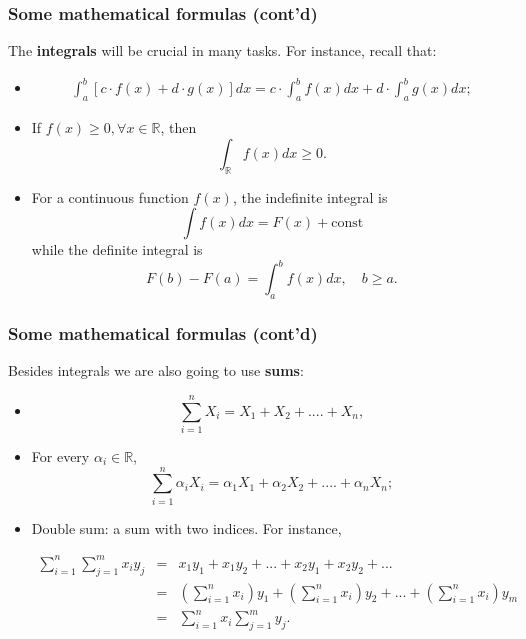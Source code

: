 \documentclass[notes=show,handout]{beamer}
\newcommand{\bea}{\begin{eqnarray}}
\newcommand{\eea}{\end{eqnarray}}
\newcommand{\nn}{\nonumber}
\begin{document}
\begin{frame}
\frametitle{Some mathematical formulas (cont'd)}

The \textbf{integrals} will be crucial in many tasks. For instance, recall that:

\begin{itemize}
\item \bea 
\int_{a}^{b} \left[c \cdot f(x) + d \cdot g(x) \right]dx = c  \cdot \int_{a}^{b}   f(x) dx + d \cdot \int_{a}^{b}   g(x) dx; \nn
\eea 
\item If $f(x) \geq 0, \forall x \in \mathbb{R}$, then 
$$ \int_{\mathbb{R}} f(x) dx \geq 0. $$
\item For a continuous function $f(x)$, the indefinite integral is 
$$
\int f(x) dx = F(x) + \text{const}
$$
while the definite integral is
$$
F(b)-F(a)= \int_{a}^{b} f(x) dx, \quad b \geq a.
$$
\end{itemize}
\end{frame}


\begin{frame}
\frametitle{Some mathematical formulas (cont'd)}

Besides integrals we are also going to use \textbf{sums}:

\begin{itemize}
\item $$\sum_{i=1}^{n} X_{i} = X_1 + X_2 +....+ X_n,$$
\item For every $\alpha_i \in \mathbb{R}$,  $$\sum_{i=1}^{n} \alpha_i X_{i} = \alpha_1 X_1 + \alpha_2 X_2 +....+ \alpha_n X_n;$$ 
\item Double sum: a sum with two indices. For instance,
\begin{small}
\bea
\sum_{i=1}^{n} \sum_{j=1}^{m}  x_{i}y_{j}  &=& x_1y_1 + x_1 y_2 +... +x_2y_1+ x_2y_2 +... \nonumber \\
&=& \left(\sum_{i=1}^{n} x_i\right) y_1 +  \left(\sum_{i=1}^{n} x_i\right) y_2 + ... +  \left(\sum_{i=1}^{n} x_i\right) y_m  \nonumber \\
&=& \sum_{i=1}^{n} x_i \sum_{j=1}^{m} y_j. \nonumber
\eea
\end{small}
\end{itemize}
\end{frame}
\end{document}
